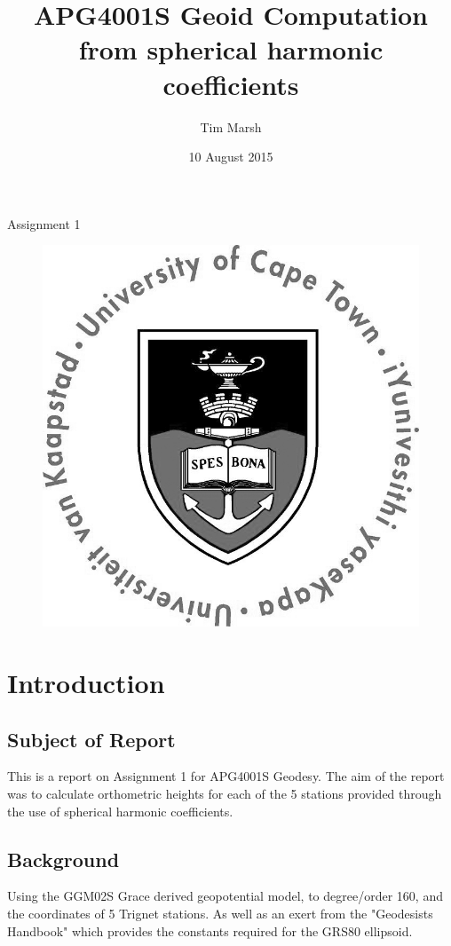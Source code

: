 \documentclass[12pt,a4paper]{article}
\title{APG4001S Geoid Computation from spherical harmonic coefficients}
\date{10 August 2015}
\author{Tim Marsh}
\begin{document}
	
	\maketitle
	\begin{center}
		\Large Assignment 1
	\end{center}
	
	\begin{figure}[H]
		\centering
		\includegraphics[width=0.7\linewidth]{UCTcircular_logo1_CMYK}
		\label{fig:UCTcircular_logo1_CMYK}
	\end{figure}
	\newpage
	\tableofcontents
	\listoffigures
	
	\newpage
	\section{Introduction}
	
	\subsection{Subject of Report}
	This is a report on Assignment 1 for APG4001S Geodesy. The aim of the report was to calculate orthometric heights for each of the 5 stations provided through the use of spherical harmonic coefficients. 
	
	\subsection{Background}
	Using the GGM02S Grace derived geopotential model, to degree/order 160, and the coordinates of 5 Trignet stations. As well as an exert from the "Geodesists Handbook" which provides the constants required for the GRS80 ellipsoid.
	
\end{document}
